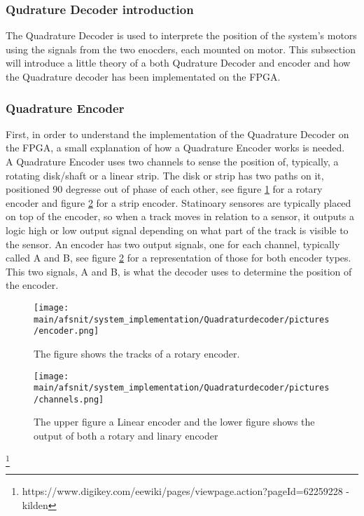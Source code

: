 \documentclass[../../../main]{subfiles}
\begin{document}
\subsubsection{Qudrature Decoder introduction}
The Quadrature Decoder is used to interprete the position of the system's motors using the signals from the two enocders, each  mounted on motor. This subsection will introduce a little theory of a both Qudrature Decoder and encoder and how the Quadrature decoder has been implementated on the FPGA.
\subsubsection{Quadrature Encoder}
\label{sub:Theory}

First, in order to understand the implementation of the Quadrature Decoder on the FPGA, a small explanation of how a Quadrature Encoder works is needed. \\
A Quadrature Encoder uses two channels to sense the position of, typically, a rotating disk/shaft or a linear strip. The disk or strip has two paths on it, positioned 90 degresse out of phase of each other, see figure \ref{rotary_encoder} for a rotary encoder and figure \ref{channels_1} for a strip encoder. Statinoary sensores are typically placed on top of the encoder, so when a track moves in relation to a sensor, it outputs a logic high or low output signal depending on what part of the track is visible to the sensor. An encoder has two output signals, one for each channel, typically called A and B, see figure \ref{channels_1} for a representation of those for both encoder types. This two signals, A and B, is what the decoder uses to determine the position of the encoder.

\begin{figure}[H]
  \texttt{[image: \\main/afsnit/system\_implementation/Quadraturdecoder/pictures/encoder.png]}
  \caption{The figure shows the tracks of a rotary encoder.}
  \label{rotary_encoder}
\end{figure}

\begin{figure}[H]
  \texttt{[image: \\main/afsnit/system\_implementation/Quadraturdecoder/pictures/channels.png]}
  \caption{The upper figure a Linear encoder and the lower figure shows the output of both a rotary and linary encoder}
  \label{channels_1}
\end{figure}
\footnote{https://www.digikey.com/eewiki/pages/viewpage.action?pageId=62259228 - kilden}
\end{document}
